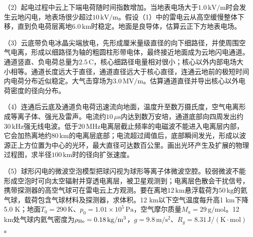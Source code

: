 \documentclass[12pt,a4paper,fontset=fandol]{ctexart}
\begin{document}
（2）起电过程中云上下端电荷随时间指数增加。当地表电场大于\(1.0\,\mathrm{kV/m}\)时会发生云地闪电，地表场很少超过\(10\,\mathrm{kV/m}\)。假设（1）中的雷电云从高空缓慢整体下移，直到负电荷层离地\(6.0\,\mathrm{km}\)时稳定。地面是良导体，估算云正下方地表电场。

（3）云底带负电冰晶尖端放电，先形成厘米量级直径的向下细路径，并使周围空气电离，形成以细路径为轴的粗圆柱形带电体，最终接近地面成为云地闪电通道。通道竖直、负电荷总量为\(2.5\,\mathrm C\)，核心细路径电量相对很小；核心以外内部电场大小相等。通道长度远大于直径，通道直径远大于核心直径，连通云地前的极短时间内电荷分布近似稳定。大气击穿场为\(3.0\,\mathrm{MV/m}\)。估算通道直径并导出核心以外电荷密度的径向分布。

（4）连通后云底及通道负电荷迅速流向地面，温度升至数万摄氏度，空气电离形成等离子体、强光及雷声。电流约\(10\,\mu\mathrm s\)内达到数万安培，通道底部向四周发出约\(30\,\mathrm{kHz}\)强无线电波。低于\(20\,\mathrm{MHz}\)电离层截止频率的电磁波不能进入电离层内部，它会加热离地约\(80\,\mathrm{km}\)的电离层底部；电流超过阈值后，底部瞬间发光，形成以波源正上方位置为中心的光环，最大直径可达数百公里。画出光环产生及扩展的物理过程图，求半径\(100\,\mathrm{km}\)时的径向扩张速度。

（5）球形闪电的微波空泡模型把球闪视为球形等离子体微波空腔。较弱微波不能形成空泡时可向太空辐射并穿透电离层，被卫星观测到；电离层色散会干扰信号，携带探测器的高空气球可在雷电云上方观测。要在离地\(12\,\mathrm{km}\)悬浮载荷为\(50\,\mathrm{kg}\)的氦气球，载荷包含气球材料及探测器，求体积。12
km以下空气温度每升高1 km下降5.0
K；地面\(T_0=290\,\mathrm K\)、\(p_0=1.01\times10^5\,\mathrm{Pa}\)，空气摩尔质量\(M_a=29\,\mathrm{g/mol}\)。12
km处气球内氦气密度为\(\rho_{\rm He}=0.18\,\mathrm{kg/m^3}\)，\(g=9.8\,\mathrm{m/s^2}\)、\(R_g=8.31\,\mathrm{J/(K\cdot mol)}\)。
\end{document}
